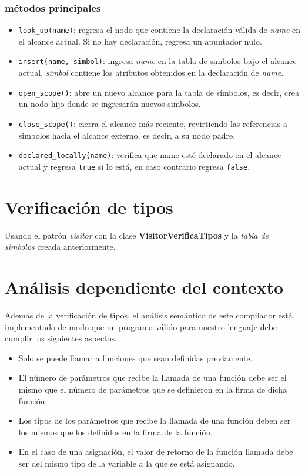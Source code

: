 \documentclass[12pt]{article}
\begin{document}
\subsubsection{métodos principales}
\begin{itemize}
\item \texttt{look\_up(name)}: regresa el nodo que contiene la declaración válida de \emph{name} en el alcance actual. Si no hay declaración, regresa un apuntador nulo.
\item \texttt{insert(name, simbol)}: ingresa \emph{name} en la tabla de simbolos bajo el alcance actual, \emph{simbol} contiene los atributos obtenidos en la declaración de \emph{name}.
\item \texttt{open\_scope()}: abre un nuevo alcance para la tabla de símbolos, es decir, crea un nodo hijo donde se ingresarán nuevos simbolos.
\item \texttt{close\_scope()}: cierra el alcance más reciente, revirtiendo las referencias a simbolos hacia el alcance externo, es decir, a su nodo padre.
\item \texttt{declared\_locally(name)}: verifica que name esté declarado en el alcance actual y regresa \texttt{true} si lo está, en caso contrario regresa \texttt{false}.
\end{itemize}
\section{Verificación de tipos}
Usando el patrón \textit{visitor} con la clase \textbf{VisitorVerificaTipos} y la \textit{tabla de simbolos} creada anteriormente.
\section{Análisis dependiente del contexto}
Además de la verificación de tipos, el análisis semántico de este compilador está implementado de modo que un programa válido para nuestro lenguaje debe cumplir los siguientes aspectos.
\begin{itemize}
\item Solo se puede llamar a funciones que sean definidas previamente.
\item El número de parámetros que recibe la llamada de una función debe ser el mismo que el número de parámetros que se definieron en la firma de dicha función.
\item Los tipos de los parámetros que recibe la llamada de una función deben ser los mismos que los definidos en la firma de la función.
\item En el caso de una asignación, el valor de retorno de la función llamada debe ser del mismo tipo de la variable a la que se está asignando. 
\end{itemize}
\end{document}
